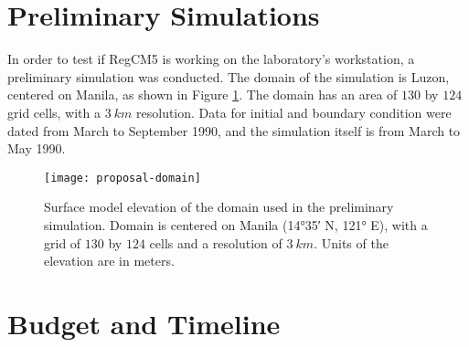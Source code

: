 \section{Preliminary Simulations}
	In order to test if RegCM5 is working on the laboratory's workstation,
		a preliminary simulation was conducted.
	The domain of the simulation is Luzon, centered on Manila, as shown in Figure \ref{fig:proposal-domain}.
	The domain has an area of $\num{130}$ by $\num{124}$ grid cells, with a $\qty{3}{km}$ resolution.
	Data for initial and boundary condition were dated from March to September 1990,
		and the simulation itself is from March to May 1990.
		
	\begin{figure}
		\centering
		\texttt{[image: proposal-domain]}
		\caption{
			Surface model elevation of the domain used in the preliminary simulation.
			Domain is centered on Manila (\ang{14;35} N, \ang{121} E),
				with a grid of $\num{130}$ by $\num{124}$ cells
				and a resolution of $\qty{3}{km}$.
			Units of the elevation are in meters.
		}
		\label{fig:proposal-domain}
	\end{figure}
	

\section{Budget and Timeline}